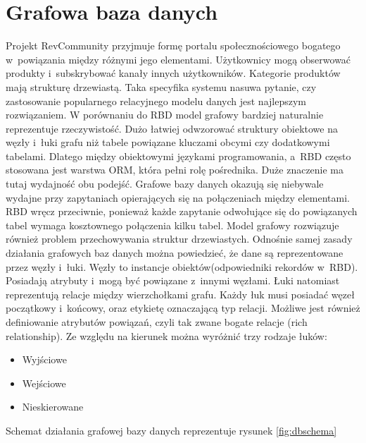 \section{Grafowa baza danych}

Projekt RevCommunity przyjmuje formę portalu społecznościowego bogatego w~powiązania między różnymi jego elementami. Użytkownicy mogą obserwować produkty i~subskrybować kanały innych użytkowników. Kategorie produktów mają strukturę drzewiastą. Taka specyfika systemu nasuwa pytanie, czy zastosowanie popularnego relacyjnego modelu danych jest najlepszym rozwiązaniem. W porównaniu do RBD model grafowy bardziej naturalnie reprezentuje rzeczywistość. Dużo łatwiej odwzorować struktury obiektowe na węzły i~łuki grafu niż tabele powiązane kluczami obcymi czy dodatkowymi tabelami. Dlatego między obiektowymi językami programowania, a~RBD często stosowana jest warstwa ORM, która pełni rolę pośrednika. Duże znaczenie ma tutaj wydajność obu podejść. Grafowe bazy danych okazują się niebywale wydajne przy zapytaniach opierających się na połączeniach między elementami. RBD wręcz przeciwnie, ponieważ każde zapytanie odwołujące się do powiązanych tabel wymaga kosztownego połączenia kilku tabel. Model grafowy rozwiązuje również problem przechowywania struktur drzewiastych.
Odnośnie samej zasady działania grafowych baz danych można powiedzieć, że dane są reprezentowane przez węzły i~łuki. Węzły to instancje obiektów(odpowiedniki rekordów w~RBD). Posiadają atrybuty i~mogą być powiązane z~innymi węzłami. Łuki natomiast reprezentują relacje między wierzchołkami grafu. Każdy łuk musi posiadać węzeł początkowy i~końcowy, oraz etykietę oznaczającą typ relacji. Możliwe jest również definiowanie atrybutów powiązań, czyli tak zwane bogate relacje (rich relationship). Ze względu na kierunek można wyróżnić trzy rodzaje łuków:

\begin{itemize}
\item Wyjściowe
\item Wejściowe
\item Nieskierowane
\end{itemize}

\noindent
Schemat działania grafowej bazy danych reprezentuje rysunek \ref{fig:dbschema}


